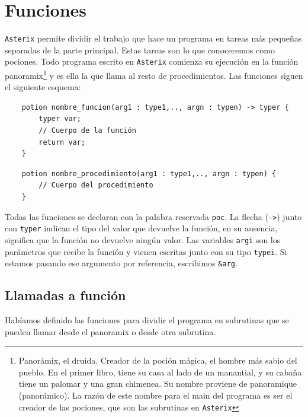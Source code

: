 \documentclass[a4paper, 10pt]{article}
\newcommand{\atx}{\texttt{Asterix} }
\begin{document}
\begin{table}[t]
\begin{center}
\begin{tabular}{| c | c | c | c | c |}
     
    \hline
    \end{tabular}
    \end{center}
    \end{table}

    \section*{Funciones}
    \atx permite dividir el trabajo que hace un programa en tareas más
    pequeñas separadas de la parte principal. Estas tareas son lo que conoceremos
    como pociones. Todo programa escrito en \atx comienza su ejecución en la
    función \textsf{panoramix}\footnote{Panorámix, el druida. Creador de la
    poción mágica, el hombre más sabio del pueblo. En el primer libro, tiene su
    casa al lado de un manantial, y su cabaña tiene un palomar y una gran
    chimenea. Su nombre proviene de panoramique (panorámico). La razón de este
    nombre para el main del programa es ser el creador de las pociones, que son
    las subrutinas en \atx} y es ella la que llama al resto de procedimientos.
    Las funciones siguen el siguiente esquema: 

    \begin{verbatim}
    potion nombre_funcion(arg1 : type1,.., argn : typen) -> typer {
        typer var;
        // Cuerpo de la función
        return var; 
    }
    \end{verbatim}

    \begin{verbatim}
    potion nombre_procedimiento(arg1 : type1,.., argn : typen) {
        // Cuerpo del procedimiento
    }
    \end{verbatim}
    
    Todas las funciones se declaran con la palabra reservada \texttt{poc}. La
    flecha (\texttt{->}) junto con \texttt{typer} indican el tipo del valor que
    devuelve la función, en su ausencia, significa que la función no devuelve
    ningún valor. Las variables \texttt{argi} son los parámetros que recibe la
    función y vienen escritas junto con su tipo \texttt{typei}. Si estamos
    pasando ese argumento por referencia, escribimos \texttt{\&arg}.
    
    \subsection *{Llamadas a función}
    Habíamos definido las funciones para dividir el programa en subrutinas que
    se pueden llamar desde el \textsf{panoramix} o desde otra subrutina.
    
\end{document}
